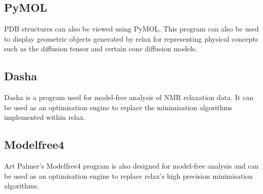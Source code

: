 \subsection{PyMOL}

PDB structures can also be viewed using PyMOL.
This program can also be used to display geometric objects generated by relax for representing physical concepts such as the diffusion tensor and certain cone diffusion models.


\subsection{Dasha}

Dasha is a program used for model-free analysis of NMR relaxation data.
It can be used as an optimisation engine to replace the minimisation algorithms implemented within relax.


\subsection{Modelfree4}

Art Palmer's Modelfree4 program is also designed for model-free analysis and can be used as an optimisation engine to replace relax's high precision minimisation algorithms.
